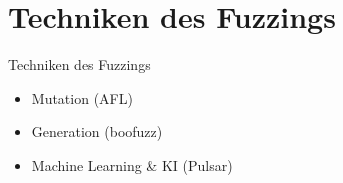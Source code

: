 \section{Techniken des Fuzzings}\label{sec:techniken-des-fuzzings}
\begin{frame}{Techniken des Fuzzings}
    \begin{itemize}
        \item Mutation (AFL)
        \item Generation (boofuzz)
        \item \alert{Machine Learning \& KI} (Pulsar)
    \end{itemize}
\end{frame}
